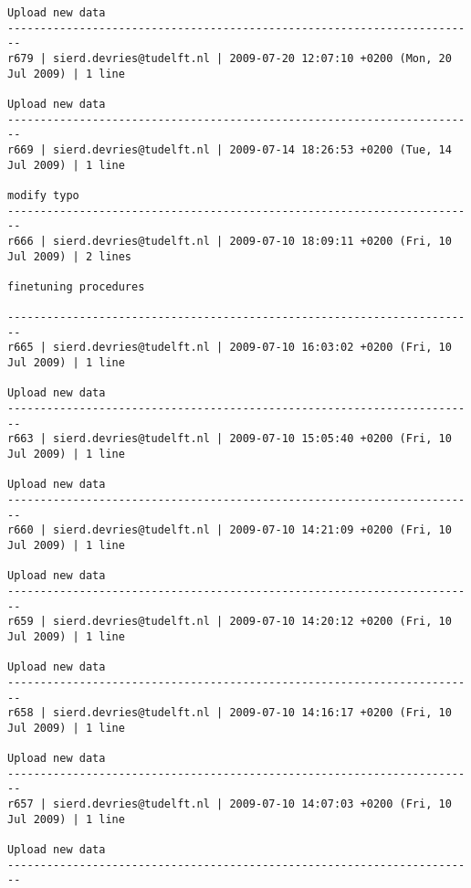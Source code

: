 \documentclass[9]{report}
\begin{document}
\begin{description}
\begin{verbatim}
Upload new data
------------------------------------------------------------------------
r679 | sierd.devries@tudelft.nl | 2009-07-20 12:07:10 +0200 (Mon, 20 Jul 2009) | 1 line

Upload new data
------------------------------------------------------------------------
r669 | sierd.devries@tudelft.nl | 2009-07-14 18:26:53 +0200 (Tue, 14 Jul 2009) | 1 line

modify typo
------------------------------------------------------------------------
r666 | sierd.devries@tudelft.nl | 2009-07-10 18:09:11 +0200 (Fri, 10 Jul 2009) | 2 lines

finetuning procedures

------------------------------------------------------------------------
r665 | sierd.devries@tudelft.nl | 2009-07-10 16:03:02 +0200 (Fri, 10 Jul 2009) | 1 line

Upload new data
------------------------------------------------------------------------
r663 | sierd.devries@tudelft.nl | 2009-07-10 15:05:40 +0200 (Fri, 10 Jul 2009) | 1 line

Upload new data
------------------------------------------------------------------------
r660 | sierd.devries@tudelft.nl | 2009-07-10 14:21:09 +0200 (Fri, 10 Jul 2009) | 1 line

Upload new data
------------------------------------------------------------------------
r659 | sierd.devries@tudelft.nl | 2009-07-10 14:20:12 +0200 (Fri, 10 Jul 2009) | 1 line

Upload new data
------------------------------------------------------------------------
r658 | sierd.devries@tudelft.nl | 2009-07-10 14:16:17 +0200 (Fri, 10 Jul 2009) | 1 line

Upload new data
------------------------------------------------------------------------
r657 | sierd.devries@tudelft.nl | 2009-07-10 14:07:03 +0200 (Fri, 10 Jul 2009) | 1 line

Upload new data
------------------------------------------------------------------------


\end{verbatim}
\end{description}
\end{document}
